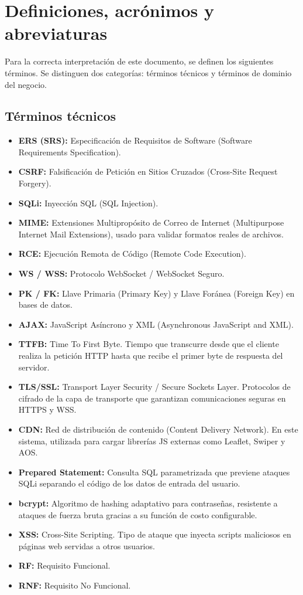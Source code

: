 \documentclass[11pt,a4paper]{report}
\begin{document}
\section{Definiciones, acrónimos y abreviaturas}
Para la correcta interpretación de este documento, se definen los siguientes términos. Se distinguen dos categorías: términos técnicos y términos de dominio del negocio.

\subsection{Términos técnicos}
\begin{itemize}
    \item \textbf{ERS (SRS):} Especificación de Requisitos de Software (Software Requirements Specification).
    \item \textbf{CSRF:} Falsificación de Petición en Sitios Cruzados (Cross-Site Request Forgery).
    \item \textbf{SQLi:} Inyección SQL (SQL Injection).
    \item \textbf{MIME:} Extensiones Multipropósito de Correo de Internet (Multipurpose Internet Mail Extensions), usado para validar formatos reales de archivos.
    \item \textbf{RCE:} Ejecución Remota de Código (Remote Code Execution).
    \item \textbf{WS / WSS:} Protocolo WebSocket / WebSocket Seguro.
    \item \textbf{PK / FK:} Llave Primaria (Primary Key) y Llave Foránea (Foreign Key) en bases de datos.
    \item \textbf{AJAX:} JavaScript Asíncrono y XML (Asynchronous JavaScript and XML).
    \item \textbf{TTFB:} Time To First Byte. Tiempo que transcurre desde que el cliente realiza la petición HTTP hasta que recibe el primer byte de respuesta del servidor.
    \item \textbf{TLS/SSL:} Transport Layer Security / Secure Sockets Layer. Protocolos de cifrado de la capa de transporte que garantizan comunicaciones seguras en HTTPS y WSS.
    \item \textbf{CDN:} Red de distribución de contenido (Content Delivery Network). En este sistema, utilizada para cargar librerías JS externas como Leaflet, Swiper y AOS.
    \item \textbf{Prepared Statement:} Consulta SQL parametrizada que previene ataques SQLi separando el código de los datos de entrada del usuario.
    \item \textbf{bcrypt:} Algoritmo de hashing adaptativo para contraseñas, resistente a ataques de fuerza bruta gracias a su función de costo configurable.
    \item \textbf{XSS:} Cross-Site Scripting. Tipo de ataque que inyecta scripts maliciosos en páginas web servidas a otros usuarios.
    \item \textbf{RF:} Requisito Funcional.
    \item \textbf{RNF:} Requisito No Funcional.
\end{itemize}
\end{document}

